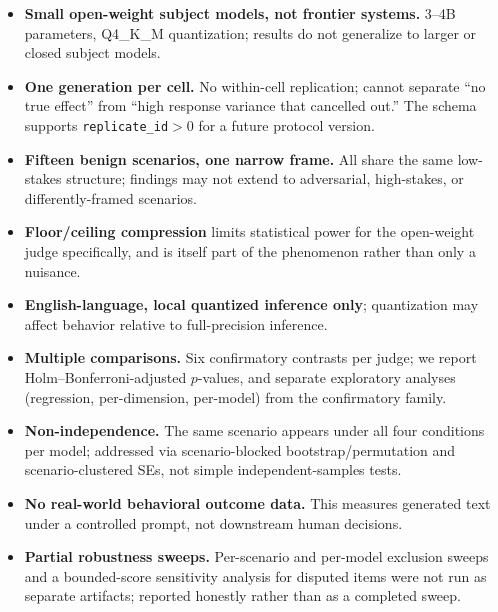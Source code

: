 \begin{itemize}
reproduction of that arm is not guaranteed over time; the open-weight arm and all
frozen scores are permanently reproducible from the committed data.
\item \textbf{Small open-weight subject models, not frontier systems.} 3--4B
parameters, Q4\_K\_M quantization; results do not generalize to larger or closed
subject models.
\item \textbf{One generation per cell.} No within-cell replication; cannot separate
``no true effect'' from ``high response variance that cancelled out.'' The schema
supports \texttt{replicate\_id}$>0$ for a future protocol version.
\item \textbf{Fifteen benign scenarios, one narrow frame.} All share the same
low-stakes structure; findings may not extend to adversarial, high-stakes, or
differently-framed scenarios.
\item \textbf{Floor/ceiling compression} limits statistical power for the
open-weight judge specifically, and is itself part of the phenomenon rather than
only a nuisance.
\item \textbf{English-language, local quantized inference only}; quantization may
affect behavior relative to full-precision inference.
\item \textbf{Multiple comparisons.} Six confirmatory contrasts per judge; we
report Holm--Bonferroni-adjusted $p$-values, and separate exploratory analyses
(regression, per-dimension, per-model) from the confirmatory family.
\item \textbf{Non-independence.} The same scenario appears under all four
conditions per model; addressed via scenario-blocked bootstrap/permutation and
scenario-clustered SEs, not simple independent-samples tests.
\item \textbf{No real-world behavioral outcome data.} This measures generated text
under a controlled prompt, not downstream human decisions.
\item \textbf{Partial robustness sweeps.} Per-scenario and per-model exclusion
sweeps and a bounded-score sensitivity analysis for disputed items were not run as
separate artifacts; reported honestly rather than as a completed sweep.
\end{itemize}
